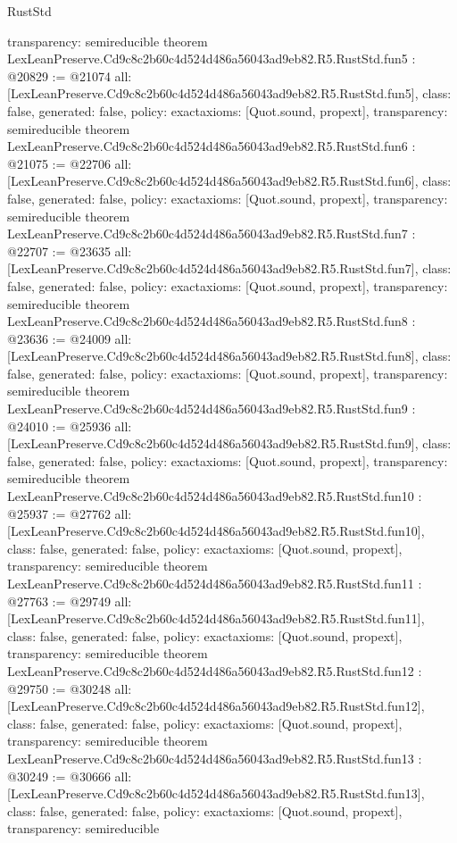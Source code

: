 \begin{lexlean}{RustStd}
\begin{coremodule}
{  transparency: semireducible
}
theorem LexLeanPreserve.Cd9c8c2b60c4d524d486a56043ad9eb82.R5.RustStd.fun5 : @20829 := @21074 {
  all: [LexLeanPreserve.Cd9c8c2b60c4d524d486a56043ad9eb82.R5.RustStd.fun5],
  class: false,
  generated: false,
  policy: exact{axioms: [Quot.sound, propext]},
  transparency: semireducible
}
theorem LexLeanPreserve.Cd9c8c2b60c4d524d486a56043ad9eb82.R5.RustStd.fun6 : @21075 := @22706 {
  all: [LexLeanPreserve.Cd9c8c2b60c4d524d486a56043ad9eb82.R5.RustStd.fun6],
  class: false,
  generated: false,
  policy: exact{axioms: [Quot.sound, propext]},
  transparency: semireducible
}
theorem LexLeanPreserve.Cd9c8c2b60c4d524d486a56043ad9eb82.R5.RustStd.fun7 : @22707 := @23635 {
  all: [LexLeanPreserve.Cd9c8c2b60c4d524d486a56043ad9eb82.R5.RustStd.fun7],
  class: false,
  generated: false,
  policy: exact{axioms: [Quot.sound, propext]},
  transparency: semireducible
}
theorem LexLeanPreserve.Cd9c8c2b60c4d524d486a56043ad9eb82.R5.RustStd.fun8 : @23636 := @24009 {
  all: [LexLeanPreserve.Cd9c8c2b60c4d524d486a56043ad9eb82.R5.RustStd.fun8],
  class: false,
  generated: false,
  policy: exact{axioms: [Quot.sound, propext]},
  transparency: semireducible
}
theorem LexLeanPreserve.Cd9c8c2b60c4d524d486a56043ad9eb82.R5.RustStd.fun9 : @24010 := @25936 {
  all: [LexLeanPreserve.Cd9c8c2b60c4d524d486a56043ad9eb82.R5.RustStd.fun9],
  class: false,
  generated: false,
  policy: exact{axioms: [Quot.sound, propext]},
  transparency: semireducible
}
theorem LexLeanPreserve.Cd9c8c2b60c4d524d486a56043ad9eb82.R5.RustStd.fun10 : @25937 := @27762 {
  all: [LexLeanPreserve.Cd9c8c2b60c4d524d486a56043ad9eb82.R5.RustStd.fun10],
  class: false,
  generated: false,
  policy: exact{axioms: [Quot.sound, propext]},
  transparency: semireducible
}
theorem LexLeanPreserve.Cd9c8c2b60c4d524d486a56043ad9eb82.R5.RustStd.fun11 : @27763 := @29749 {
  all: [LexLeanPreserve.Cd9c8c2b60c4d524d486a56043ad9eb82.R5.RustStd.fun11],
  class: false,
  generated: false,
  policy: exact{axioms: [Quot.sound, propext]},
  transparency: semireducible
}
theorem LexLeanPreserve.Cd9c8c2b60c4d524d486a56043ad9eb82.R5.RustStd.fun12 : @29750 := @30248 {
  all: [LexLeanPreserve.Cd9c8c2b60c4d524d486a56043ad9eb82.R5.RustStd.fun12],
  class: false,
  generated: false,
  policy: exact{axioms: [Quot.sound, propext]},
  transparency: semireducible
}
theorem LexLeanPreserve.Cd9c8c2b60c4d524d486a56043ad9eb82.R5.RustStd.fun13 : @30249 := @30666 {
  all: [LexLeanPreserve.Cd9c8c2b60c4d524d486a56043ad9eb82.R5.RustStd.fun13],
  class: false,
  generated: false,
  policy: exact{axioms: [Quot.sound, propext]},
  transparency: semireducible
}
\end{coremodule}
\end{lexlean}
